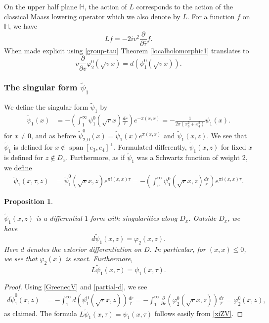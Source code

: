 \documentclass[12pt,leqno]{amsart}
\numberwithin{equation}{section}
\theoremstyle{plain}
\newtheorem{proposition}[theorem]{Proposition}
\theoremstyle{definition}
\theoremstyle{remark}
\newcommand{\h}{\mathbb{H}}
\newcommand{\Span}{\operatorname{span}}
\begin{document}
On the upper half plane $\h$, the action of $L$ corresponds to the action of the classical Maass lowering operator which we also denote by $L$. For a function $f$ on $\h$, we have
\[
Lf  = -2iv^2 \frac{\partial}{\partial \bar{\tau}} f.
\]
When made explicit using \eqref{group-tau} Theorem \ref{localholomorphic1} translates to
\begin{equation}\label{partial-d}
v \frac{\partial}{\partial v }  \varphi_2^0(\sqrt{v}x) =  d
\left(\psi_1^0(\sqrt{v}x)\right).
\end{equation}

\subsubsection{The singular form $\tilde{\psi}_1$}


We define the singular form $\tilde{\psi}_1$ by
\begin{align}\label{GreeneqV}
\tilde{\psi}_1(x)  &= - \left( \int_1^{\infty} \psi_1^0(\sqrt{r}x)  \frac{dr}{r} \right)e^{-\pi(x,x)} = - \frac1{2\pi(x_3^2+x_4^2)} \psi_1(x). 
\end{align}
for $x\ne 0$, and as before $\tilde{\psi}^0_{2,0}(x) = \tilde{\psi}_1(x) e^{\pi (x,x)}$ and 
$\tilde{\psi}_1(x,z)$. We see that $\tilde{\psi}_1$ is defined for $x \notin \Span[e_3,e_4]^{\perp}$. Formulated differently, $\tilde{\psi}_1(x,z)$ for fixed $x$ is defined for $z \notin D_x$. Furthermore, as if $\tilde{\psi}_1$ was a Schwartz function of weight $2$, we define
\begin{align}\label{xiZV}
\tilde{\psi}_1(x,\tau,z) &=  \tilde{\psi}_1^0(\sqrt{v}x,z) e^{\pi i (x,x)\tau}  = - \left( \int_v^{\infty} \psi_1^0(\sqrt{r}x,z) \frac{dr}{r} \right) e^{\pi i (x,x)\tau}.
\end{align}

\begin{proposition}\label{schluesselV}

$\tilde{\psi}_1(x,z)$ is a differential $1$-form with singularities along $D_x$. Outside $D_{x}$, we have
\[
d\tilde{\psi}_1(x,z) = \varphi_2(x,z).
\]
Here $d$ denotes the exterior differentiation on $D$. In particular,
for $(x,x)\leq 0$, we see that $\varphi_2(x)$ is exact. 
Furthermore,
\[
L\tilde{\psi}_1(x,\tau) = \psi_1(x,\tau).
\]
\end{proposition}

\begin{proof}

Using \eqref{GreeneqV} and \eqref{partial-d}, we see
\begin{align*}
d \tilde{\psi}_1^0(x,z) &= - \int_1^{\infty}d \left(\psi_1^0(\sqrt{r}x,z)\right)\frac{dr}{r}   =-\int_1^{\infty} \frac{\partial}{\partial r } \left(
\varphi_2^0(\sqrt{r}x,z)\right) \frac{dr}{r}  = \varphi_2^0(x,z),
 \end{align*}
as claimed. The formula $L\tilde{\psi}_1(x,\tau) = \psi_1(x,\tau)$ follows easily from \eqref{xiZV}.
\end{proof}
\end{document}

